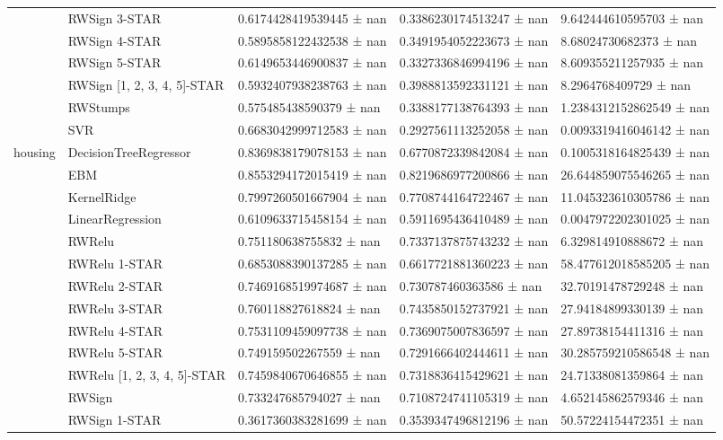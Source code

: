 \begin{tabular}{lllll}
 & RWSign 3-STAR & 0.6174428419539445 ± nan & 0.3386230174513247 ± nan & 9.642444610595703 ± nan \\
 & RWSign 4-STAR & 0.5895858122432538 ± nan & 0.3491954052223673 ± nan & 8.68024730682373 ± nan \\
 & RWSign 5-STAR & 0.6149653446900837 ± nan & 0.3327336846994196 ± nan & 8.609355211257935 ± nan \\
 & RWSign [1, 2, 3, 4, 5]-STAR & 0.5932407938238763 ± nan & 0.3988813592331121 ± nan & 8.2964768409729 ± nan \\
 & RWStumps & 0.575485438590379 ± nan & 0.3388177138764393 ± nan & 1.2384312152862549 ± nan \\
 & SVR & 0.6683042999712583 ± nan & 0.2927561113252058 ± nan & 0.0093319416046142 ± nan \\
\cline{1-5}
\multirow[t]{20}{*}{housing} & DecisionTreeRegressor & 0.8369838179078153 ± nan & 0.6770872339842084 ± nan & 0.1005318164825439 ± nan \\
 & EBM & 0.8553294172015419 ± nan & 0.8219686977200866 ± nan & 26.644859075546265 ± nan \\
 & KernelRidge & 0.7997260501667904 ± nan & 0.7708744164722467 ± nan & 11.045323610305786 ± nan \\
 & LinearRegression & 0.6109633715458154 ± nan & 0.5911695436410489 ± nan & 0.0047972202301025 ± nan \\
 & RWRelu & 0.751180638755832 ± nan & 0.7337137875743232 ± nan & 6.329814910888672 ± nan \\
 & RWRelu 1-STAR & 0.6853088390137285 ± nan & 0.6617721881360223 ± nan & 58.477612018585205 ± nan \\
 & RWRelu 2-STAR & 0.7469168519974687 ± nan & 0.730787460363586 ± nan & 32.70191478729248 ± nan \\
 & RWRelu 3-STAR & 0.760118827618824 ± nan & 0.7435850152737921 ± nan & 27.94184899330139 ± nan \\
 & RWRelu 4-STAR & 0.7531109459097738 ± nan & 0.7369075007836597 ± nan & 27.89738154411316 ± nan \\
 & RWRelu 5-STAR & 0.749159502267559 ± nan & 0.7291666402444611 ± nan & 30.285759210586548 ± nan \\
 & RWRelu [1, 2, 3, 4, 5]-STAR & 0.7459840670646855 ± nan & 0.7318836415429621 ± nan & 24.71338081359864 ± nan \\
 & RWSign & 0.733247685794027 ± nan & 0.7108724741105319 ± nan & 4.652145862579346 ± nan \\
 & RWSign 1-STAR & 0.3617360383281699 ± nan & 0.3539347496812196 ± nan & 50.57224154472351 ± nan \\

\end{tabular}

